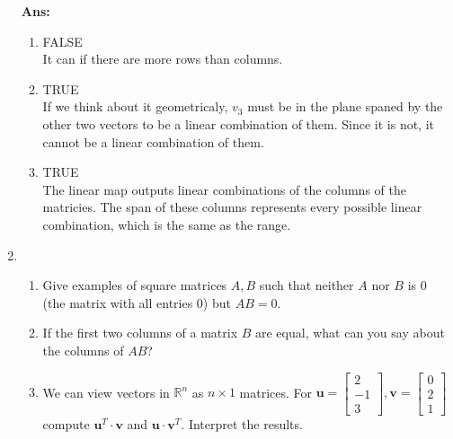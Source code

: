 \documentclass[12pt,a4paper]{amsart}
\newcommand{\bu}{\mathbf u}
\newcommand{\bv}{\mathbf v}
\newcommand{\R}{\mathbb{R}}
\newcommand\sol[1]{
\medskip
\begin{mdframed}
\textbf{Ans:\\} #1
\end{mdframed}
\medskip
}
\begin{document}
\begin{enumerate}
\sol{
  \begin{enumerate}
    \item FALSE\\
      It can if there are more rows than columns.
    \item TRUE\\
      If we think about it geometricaly, $v_3$ must be in the plane spaned by the other two vectors to be a linear combination of them. Since it is not, it cannot be a linear combination of them.
    \item TRUE\\
      The linear map outputs linear combinations of the columns of the matricies. The span of these columns represents every possible linear combination, which is the same as the range.
  \end{enumerate}
}
  
\item  
\begin{enumerate}
\item
 Give examples of square matrices $A, B$ such that neither $A$ nor $B$ is $0$ (the matrix with all entries $0$) but
 $AB = 0$. 
\item
 If the first two columns of a matrix $B$ are equal, what can you say about the columns of $AB$?
\item
 We can view vectors in $\R^n$ as $n\times 1$ matrices. For
 $\bu = \left[\begin{matrix} 2  \\ -1  \\ 3 \end{matrix}\right], \bv = \left[\begin{matrix} 0  \\ 2 \\ 1 \end{matrix}\right]$
 compute $\bu^T\cdot \bv$ and $\bu\cdot \bv^T$. Interpret the results.  
\end{enumerate}


\end{enumerate}
\end{document}
